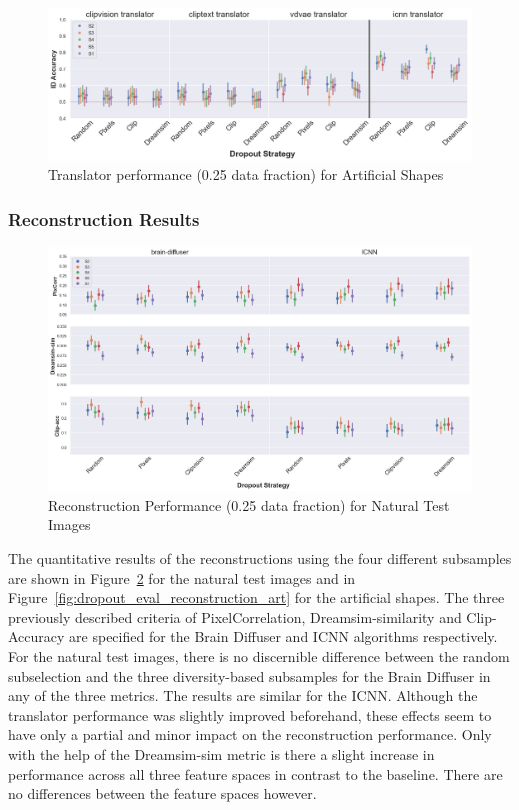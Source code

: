 \begin{figure}[ht]
  \centering
  \includegraphics[width=1\textwidth]{plots/dropout_eval_translator_art.png}
  \caption{Translator performance (0.25 data fraction) for Artificial Shapes}\label{fig:dropout_eval_translator_art}
\end{figure}


\subsubsection{Reconstruction Results}

\begin{figure}[ht]
  \centering
  \includegraphics[width=1\textwidth]{plots/dropout_eval_reconstruction_test.png}
  \caption{Reconstruction Performance (0.25 data fraction) for Natural Test Images}\label{fig:dropout_eval_reconstruction_test}
\end{figure}

The quantitative results of the reconstructions using the four different subsamples are shown in Figure~\ref{fig:dropout_eval_reconstruction_test} for the natural test images and in Figure~\ref{fig:dropout_eval_reconstruction_art} for the artificial shapes. The three previously described criteria of PixelCorrelation, Dreamsim-similarity and Clip-Accuracy are specified for the Brain Diffuser and ICNN algorithms respectively. For the natural test images, there is no discernible difference between the random subselection and the three diversity-based subsamples for the Brain Diffuser in any of the three metrics. The results are similar for the ICNN. Although the translator performance was slightly improved beforehand, these effects seem to have only a partial and minor impact on the reconstruction performance. Only with the help of the Dreamsim-sim metric is there a slight increase in performance across all three feature spaces in contrast to the baseline. There are no differences between the feature spaces however.

